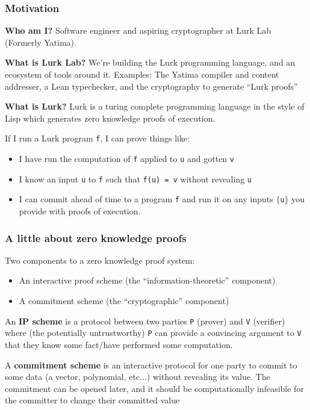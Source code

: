 \documentclass[options]{beamer}
\begin{document}
\begin{frame}[fragile]
    \frametitle{Motivation}
    {\bf Who am I?} Software engineer and aspiring cryptographer at Lurk Lab (Formerly Yatima).

    \pause
    \vspace{5pt}

    {\bf What is Lurk Lab?} We're building the Lurk programming language, and an ecosystem of tools around it.
    Examples: The Yatima compiler and content addresser, a Lean typechecker, and the cryptography to generate ``Lurk proofs''

    \pause
    \vspace{5pt}

    {\bf What is Lurk?} Lurk is a turing complete programming language in the style of Lisp which generates zero knowledge proofs of execution.

    \pause
    \vspace{5pt}

    If I run a Lurk program \verb+f+, I can prove things like:
    \begin{itemize}
        \item I have run the computation of \verb+f+ applied to \verb+u+ and gotten \verb+v+
        \item I know an input \verb+u+ to \verb+f+ such that \verb+f(u) = v+ without revealing \verb+u+
        \item I can commit ahead of time to a program \verb+f+ and run it on any inputs $\{$\verb+u+$\}$ you provide with proofs of execution.
    \end{itemize}

\end{frame}

\begin{frame}[fragile]
    \frametitle{A little about zero knowledge proofs}

    Two components to a zero knowledge proof system:
    \begin{itemize}
        \item An interactive proof scheme (the ``information-theoretic'' component)
        \item A commitment scheme (the ``cryptographic'' component)
    \end{itemize}

    \vspace{7pt}
    \pause

    An {\bf IP scheme} is a protocol between two parties \verb+P+ (prover) and \verb+V+ (verifier)
    where (the potentially untrustworthy) \verb+P+ can provide a convincing argument to \verb+V+ that they know some fact/have performed some computation.
    
    \vspace{7pt}
    \pause

    A {\bf commitment scheme} is an interactive protocol for one party to commit to some data (a vector, polynomial, etc...) without revealing its value. The commitment can be opened later, and it should be computationally infeasible for the committer to change their committed value

\end{frame}
\end{document}
